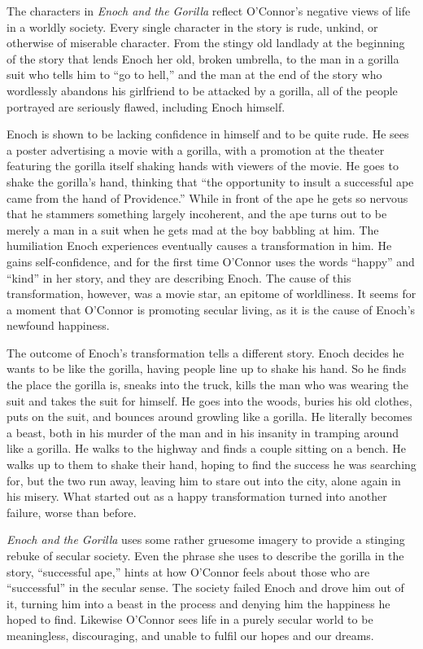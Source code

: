 \documentclass[onecolumn, 12pt]{article}
\begin{document}
The characters in \emph{Enoch and the Gorilla} reflect O'Connor's negative
views of life in a worldly society.  Every single character in the story is
rude, unkind, or otherwise of miserable character.  From the stingy old
landlady at the beginning of the story that lends Enoch her old, broken
umbrella, to the man in a gorilla suit who tells him to ``go to hell,'' and the
man at the end of the story who wordlessly abandons his girlfriend to be
attacked by a gorilla, all of the people portrayed are seriously flawed, 
including Enoch himself.

Enoch is shown to be lacking confidence in himself and to be quite rude.  He
sees a poster advertising a movie with a gorilla, with a promotion at the
theater featuring the gorilla itself shaking hands with viewers of the movie.
He goes to shake the gorilla's hand, thinking that ``the opportunity to insult
a successful ape came from the hand of Providence.''  While in front of the ape
he gets so nervous that he stammers something largely incoherent, and the ape
turns out to be merely a man in a suit when he gets mad at the boy babbling at
him.  The humiliation Enoch experiences eventually causes a transformation in
him.  He gains self-confidence, and for the first time O'Connor uses the words
``happy'' and ``kind'' in her story, and they are describing Enoch.  The cause
of this transformation, however, was a movie star, an epitome of worldliness.
It seems for a moment that O'Connor is promoting secular living, as it is the
cause of Enoch's newfound happiness.

The outcome of Enoch's transformation tells a different story.  Enoch decides
he wants to be like the gorilla, having people line up to shake his hand.  So
he finds the place the gorilla is, sneaks into the truck, kills the man who was
wearing the suit and takes the suit for himself.  He goes into the woods,
buries his old clothes, puts on the suit, and bounces around growling like a
gorilla.  He literally becomes a beast, both in his murder of the man and in
his insanity in tramping around like a gorilla.  He walks to the highway and
finds a couple sitting on a bench.  He walks up to them to shake their hand,
hoping to find the success he was searching for, but the two run away, leaving
him to stare out into the city, alone again in his misery.  What started out as
a happy transformation turned into another failure, worse than before.

\emph{Enoch and the Gorilla} uses some rather gruesome imagery to provide a
stinging rebuke of secular society.  Even the phrase she uses to describe the
gorilla in the story, ``successful ape,'' hints at how O'Connor feels about
those who are ``successful'' in the secular sense.  The society failed Enoch
and drove him out of it, turning him into a beast in the process and denying
him the happiness he hoped to find.  Likewise O'Connor sees life in a purely
secular world to be meaningless, discouraging, and unable to fulfil our hopes
and our dreams.
\end{document}
